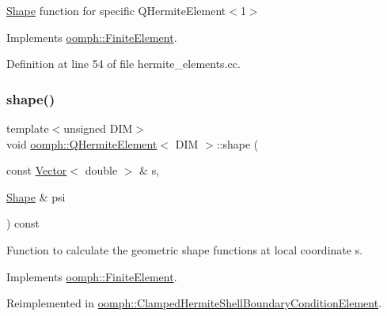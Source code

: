 \hyperlink{classoomph_1_1Shape}{Shape} function for specific Q\+Hermite\+Element$<$1$>$ 



Implements \hyperlink{classoomph_1_1FiniteElement_a58a25b6859ddd43b7bfe64a19fee5023}{oomph\+::\+Finite\+Element}.



Definition at line 54 of file hermite\+\_\+elements.\+cc.

\mbox{\label{classoomph_1_1QHermiteElement_a0e5d50fb86a7eb4c8a30ca8392d5a216}} 
\subsubsection{\texorpdfstring{shape()}{shape()}\hspace{0.1cm}{\footnotesize\ttfamily [2/3]}}
{\footnotesize\ttfamily template$<$unsigned D\+IM$>$ \\
void \hyperlink{classoomph_1_1QHermiteElement}{oomph\+::\+Q\+Hermite\+Element}$<$ D\+IM $>$\+::shape (\begin{DoxyParamCaption}\item[{const \hyperlink{classoomph_1_1Vector}{Vector}$<$ double $>$ \&}]{s,  }\item[{\hyperlink{classoomph_1_1Shape}{Shape} \&}]{psi }\end{DoxyParamCaption}) const\hspace{0.3cm}{\ttfamily [virtual]}}



Function to calculate the geometric shape functions at local coordinate s. 



Implements \hyperlink{classoomph_1_1FiniteElement_a58a25b6859ddd43b7bfe64a19fee5023}{oomph\+::\+Finite\+Element}.



Reimplemented in \hyperlink{classoomph_1_1ClampedHermiteShellBoundaryConditionElement_ae9a3033b7bcba34dafcb7154be331b7f}{oomph\+::\+Clamped\+Hermite\+Shell\+Boundary\+Condition\+Element}.

\mbox{\label{classoomph_1_1QHermiteElement_a46e93a6e3daf826f6d734e450da38899}} 
